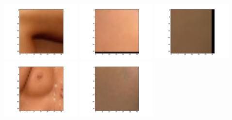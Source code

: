 \includegraphics[width=4cm]{dbshow-5-0.png} 
\includegraphics[width=4cm]{dbshow-5-1.png} 
\includegraphics[width=4cm]{dbshow-5-2.png} 
\includegraphics[width=4cm]{dbshow-5-3.png} 
\includegraphics[width=4cm]{dbshow-5-4.png} 
